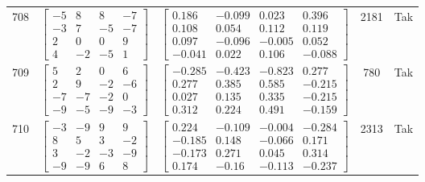 \documentclass[a4paper,12pt]{article}
\begin{document}
\begin{tabular}{c c c c c}
708
&
$\begin{bmatrix} -5 & 8 & 8 & -7 \\ -3 & 7 & -5 & -7 \\ 2 & 0 & 0 & 9 \\ 4 & -2 & -5 & 1 \end{bmatrix}$
&
$\begin{bmatrix} 0.186 & -0.099 & 0.023 & 0.396 \\ 0.108 & 0.054 & 0.112 & 0.119 \\ 0.097 & -0.096 & -0.005 & 0.052 \\ -0.041 & 0.022 & 0.106 & -0.088 \end{bmatrix}$
&
2181
&
Tak
\\
709
&
$\begin{bmatrix} 5 & 2 & 0 & 6 \\ 2 & 9 & -2 & -6 \\ -7 & -7 & -2 & 0 \\ -9 & -5 & -9 & -3 \end{bmatrix}$
&
$\begin{bmatrix} -0.285 & -0.423 & -0.823 & 0.277 \\ 0.277 & 0.385 & 0.585 & -0.215 \\ 0.027 & 0.135 & 0.335 & -0.215 \\ 0.312 & 0.224 & 0.491 & -0.159 \end{bmatrix}$
&
780
&
Tak
\\
710
&
$\begin{bmatrix} -3 & -9 & 9 & 9 \\ 8 & 5 & 3 & -2 \\ 3 & -2 & -3 & -9 \\ -9 & -9 & 6 & 8 \end{bmatrix}$
&
$\begin{bmatrix} 0.224 & -0.109 & -0.004 & -0.284 \\ -0.185 & 0.148 & -0.066 & 0.171 \\ -0.173 & 0.271 & 0.045 & 0.314 \\ 0.174 & -0.16 & -0.113 & -0.237 \end{bmatrix}$
&
2313
&
Tak
\\
\end{tabular} \egroup \newpage
\end{document}
